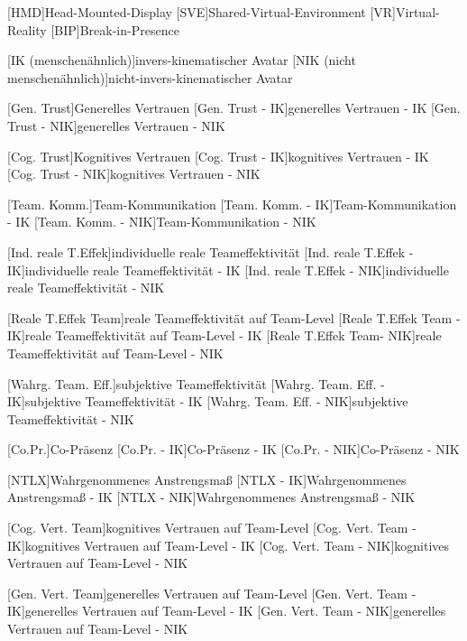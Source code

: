 \begin{acronym}
	[HMD]{Head-Mounted-Display}
	[SVE]{Shared-Virtual-Environment}
	[VR]{Virtual-Reality}
	[BIP]{Break-in-Presence}
	
	[IK (menschenähnlich)]{invers-kinematischer Avatar}
	[NIK (nicht menschenähnlich)]{nicht-invers-kinematischer Avatar}
	
	[Gen. Trust]{Generelles Vertrauen}
	[Gen. Trust - IK]{generelles Vertrauen - IK}
	[Gen. Trust - NIK]{generelles Vertrauen - NIK}
	
	[Cog. Trust]{Kognitives Vertrauen}
	[Cog. Trust - IK]{kognitives Vertrauen - IK}
	[Cog. Trust - NIK]{kognitives Vertrauen - NIK}
	
	[Team. Komm.]{Team-Kommunikation}
	[Team. Komm. - IK]{Team-Kommunikation - IK}
	[Team. Komm. - NIK]{Team-Kommunikation - NIK}
	
	[Ind. reale T.Effek]{individuelle reale Teameffektivität}
	[Ind. reale T.Effek - IK]{individuelle reale Teameffektivität - IK}
	[Ind. reale T.Effek - NIK]{individuelle reale Teameffektivität - NIK}	
	
	[Reale T.Effek Team]{reale Teameffektivität auf Team-Level}
	[Reale T.Effek Team - IK]{reale Teameffektivität auf Team-Level - IK}
	[Reale T.Effek Team- NIK]{reale Teameffektivität auf Team-Level - NIK}
	
	[Wahrg. Team. Eff.]{subjektive Teameffektivität}
	[Wahrg. Team. Eff. - IK]{subjektive Teameffektivität - IK}
	[Wahrg. Team. Eff. - NIK]{subjektive Teameffektivität - NIK}
	
	[Co.Pr.]{Co-Präsenz}
	[Co.Pr. - IK]{Co-Präsenz - IK}
	[Co.Pr. - NIK]{Co-Präsenz - NIK}
	
	[NTLX]{Wahrgenommenes Anstrengsmaß}
	[NTLX - IK]{Wahrgenommenes Anstrengsmaß - IK}
	[NTLX - NIK]{Wahrgenommenes Anstrengsmaß - NIK}
	
	[Cog. Vert. Team]{kognitives Vertrauen auf Team-Level}
	[Cog. Vert. Team - IK]{kognitives Vertrauen auf Team-Level - IK}
	[Cog. Vert. Team - NIK]{kognitives Vertrauen auf Team-Level - NIK}
	
	[Gen. Vert. Team]{generelles Vertrauen auf Team-Level}
	[Gen. Vert. Team - IK]{generelles Vertrauen auf Team-Level - IK}
	[Gen. Vert. Team - NIK]{generelles Vertrauen auf Team-Level - NIK}
	

\end{acronym}
